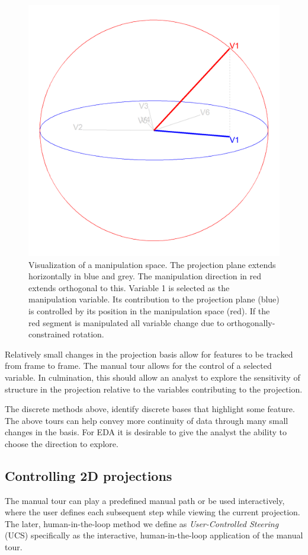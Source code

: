 \documentclass[
  11,
]{article}
\begin{document}
\begin{figure}[h]

{\centering \includegraphics[width=0.6\linewidth,]{./figures/manipSp} 

}

\caption{Visualization of a manipulation space. The projection plane extends horizontally in blue and grey. The manipulation direction in red extends orthogonal to this. Variable 1 is selected as the manipulation variable. Its contribution to the projection plane (blue) is controlled by its position in the manipulation space (red). If the red segment is manipulated all variable change due to orthogonally-constrained rotation.}\label{fig:manipSp}
\end{figure}

Relatively small changes in the projection basis allow for features to be tracked from frame to frame. The manual tour allows for the control of a selected variable. In culmination, this should allow an analyst to explore the sensitivity of structure in the projection relative to the variables contributing to the projection.

The discrete methods above, identify discrete bases that highlight some feature. The above tours can help convey more continuity of data through many small changes in the basis. For EDA it is desirable to give the analyst the ability to choose the direction to explore.

\hypertarget{controlling-2d-projections}{%
\subsection{Controlling 2D projections}\label{controlling-2d-projections}}

The manual tour can play a predefined manual path or be used interactively, where the user defines each subsequent step while viewing the current projection. The later, human-in-the-loop method we define as \emph{User-Controlled Steering} (UCS) specifically as the interactive, human-in-the-loop application of the manual tour.
\end{document}
